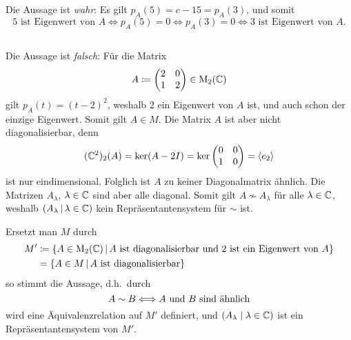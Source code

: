 \subsection{}

Die Aussage ist \emph{wahr}:
Es gilt $p_A(5) = c-15 = p_A(3)$, und somit
\[
        \text{$5$ ist Eigenwert von $A$}
  \iff  p_A(5) = 0
  \iff  p_A(3) = 0
  \iff  \text{$3$ ist Eigenwert von $A$}.
\]





\subsection{}

Die Aussage ist \emph{falsch}:
Für die Matrix
\[
            A
  \coloneqq \begin{pmatrix}
              2 & 0
            \\
              1 & 2
            \end{pmatrix}
  \in       \matrices{2}{\complex}
\]
gilt $p_A(t) = (t-2)^2$, weshalb $2$ ein Eigenwert von $A$ ist, und auch schon der einzige Eigenwert.
Somit gilt $A \in M$.
Die Matrix $A$ ist aber nicht diagonalisierbar, denn
\[
    \eigenspace{(\complex^2)}{A}{2}
  = \ker (A - 2I)
  = \ker \begin{pmatrix}
           0 & 0
          \\
           1 & 0
         \end{pmatrix}
  = \generated{e_2}
\]
ist nur eindimensional.
Folglich ist $A$ zu keiner Diagonalmatrix ähnlich.
Die Matrizen $A_\lambda$, $\lambda \in \complex$ sind aber alle diagonal.
Somit gilt $A \nsim A_\lambda$ für alle $\lambda \in \complex$, weshalb $(A_\lambda \suchthat \lambda \in \complex)$ kein Repräsentantensystem für ${\sim}$ ist.

\begin{remark}
  Ersetzt man $M$ durch
  \begin{align*}
              M'
    &\coloneqq  \{
                  A \in \matrices{2}{\complex}
                \suchthat
                  \text{$A$ ist diagonalisierbar und $2$ ist ein Eigenwert von $A$}
                \}
    \\
    &=          \{
                  A \in M
                \suchthat
                  \text{$A$ ist diagonalisierbar}
                \}
  \end{align*}
  so stimmt die Aussage, d.h.\ durch
  \[
    A \sim B \coloniff \text{$A$ und $B$ sind ähnlich}
  \]
  wird eine Äquivalenzrelation auf $M'$ definiert, und $(A_\lambda \mid \lambda \in \complex)$ ist ein Repräsentantensystem von $M'$.
\end{remark}












